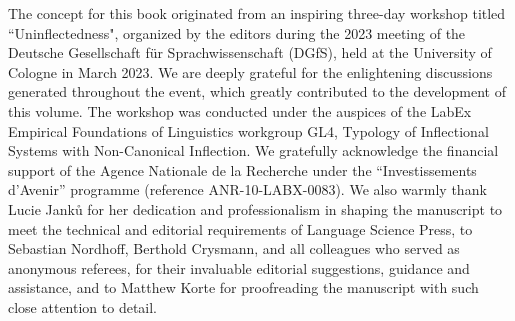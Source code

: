 \addchap{\lsAcknowledgementTitle} 

The concept for this book originated from an inspiring three-day workshop titled ``Uninflectedness", organized by the editors during the 2023 meeting of the Deutsche Gesellschaft für Sprachwissenschaft (DGfS), held at the University of Cologne in March 2023. We are deeply grateful for the enlightening discussions generated throughout the event, which greatly contributed to the development of this volume. The workshop was conducted under the auspices of the LabEx Empirical Foundations of Linguistics workgroup GL4, Typology of Inflectional Systems with Non-Canonical Inflection. We gratefully acknowledge the financial support of the Agence Nationale de la Recherche under the ``Investissements d'Avenir'' programme (reference ANR-10-LABX-0083). We also warmly thank Lucie Janků for her dedication and professionalism in shaping the manuscript to meet the technical and editorial requirements of Language Science Press, to Sebastian Nordhoff, Berthold Crysmann, and all colleagues who served as anonymous referees, for their invaluable editorial suggestions, guidance and assistance, and to Matthew Korte for proofreading the manuscript with such close attention to detail.
